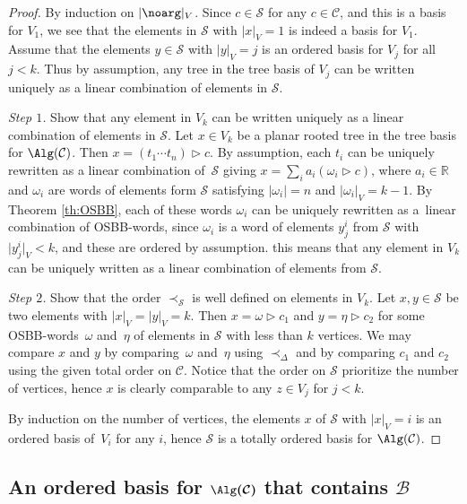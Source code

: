 \documentclass[pdftex]{sigma}
\numberwithin{equation}{section}
\begin{document}
\begin{proof}
 By induction on $|\noarg|_V$. Since $c \in \mathcal{S}$ for any $c \in \mathcal{C}$, and this is a basis for $V_1$, we see that the elements in $\mathcal{S}$ with $|x|_V=1$ is indeed a basis for $V_1$. Assume that the elements $y \in \mathcal{S}$ with $|y|_V= j$ is an ordered basis for $V_j$ for all $j<k$. Thus by assumption, any tree in the tree basis of $V_j$ can be written uniquely as a linear combination of elements in $\mathcal{S}$.

 \textit{Step $1$.} Show that any element in $V_k$ can be written uniquely as a linear combination of elements in $\mathcal{S}$. Let $x \in V_k$ be a planar rooted tree in the tree basis for $\Alg(\mathcal{C})$. Then $x = (t_1 \cdots t_n) \rhd c$. By assumption, each $t_i$ can be uniquely rewritten as a linear combination of~$\mathcal{S}$ giving $x = \sum_i a_i (\omega_i \rhd c)$, where $a_i \in \mathbb{R}$ and $\omega_i$ are words of elements form $\mathcal{S}$ satisfying $|\omega_i|=n$ and $|\omega_i|_V = k-1$. By Theorem \ref{th:OSBB}, each of these words $\omega_i$ can be uniquely rewritten as a~linear combination of OSBB-words, since $\omega_i$ is a word of elements $y^i_j$ from $\mathcal{S}$ with $\bigl|y^i_j\bigr|_V <k$, and these are ordered by assumption. this means that any element in $V_k$ can be uniquely written as a linear combination of elements from $\mathcal{S}$.

 \textit{Step $2$.} Show that the order $\prec_{\mathcal{S}}$ is well defined on elements in $V_k$. Let $x , y\in \mathcal{S}$ be two elements with $|x|_V = |y|_V = k$. Then $x = \omega \rhd c_1$ and $y= \eta \rhd c_2$ for some OSBB-words~$\omega$ and~$\eta$ of elements in $\mathcal{S}$ with less than $k$ vertices. We may compare $x$ and $y$ by comparing~$\omega$ and~$\eta$ using $\prec_{\Delta}$ and by comparing $c_1$ and $c_2$ using the given total order on $\mathcal{C}$. Notice that the order on $\mathcal{S}$ prioritize the number of vertices, hence $x$ is clearly comparable to any $z \in V_j$ for $j<k$.

 By induction on the number of vertices, the elements $x$ of $\mathcal{S}$ with $|x|_V=i$ is an ordered basis of~$V_i$ for any $i$, hence $\mathcal{S}$ is a totally ordered basis for $\Alg(\mathcal{C})$.
\end{proof}

\subsection[An ordered basis for Alg(C) that contains B]{An ordered basis for $\boldsymbol{\Alg(\mathcal{C})}$ that contains $\boldsymbol{\mathcal{B}}$}%
\end{document}
